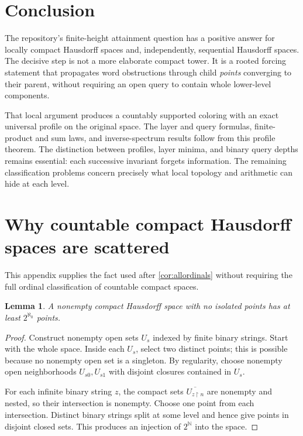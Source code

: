 \documentclass[11pt,letterpaper]{article}
\numberwithin{equation}{section}
\newtheorem{lemma}[lemma]{Lemma}
\theoremstyle{definition}
\theoremstyle{remark}
\theoremstyle{definition}
\newcommand{\N}{\mathbb N}
\begin{document}
\section{Conclusion}\label{uw:sec:conclusion}
The repository's finite-height attainment question has a positive answer for
locally compact Hausdorff spaces and, independently, sequential Hausdorff
spaces. The decisive step is not a more elaborate compact tower. It is a
rooted forcing statement that propagates word obstructions through child
\emph{points} converging to their parent, without requiring an open query to
contain whole lower-level components.

That local argument produces a countably supported coloring with an exact
universal profile on the original space. The layer and query formulas,
finite-product and sum laws, and inverse-spectrum results follow from this
profile theorem. The distinction between profiles, layer minima, and binary
query depths remains essential: each successive invariant forgets information.
The remaining classification problems concern precisely what local topology
and arithmetic can hide at each level.

\appendix
\section{Why countable compact Hausdorff spaces are scattered}\label{app:compact}

This appendix supplies the fact used after \cref{cor:allordinals} without
requiring the full ordinal classification of countable compact spaces.

\begin{lemma}
A nonempty compact Hausdorff space with no isolated points has at least
$2^{\aleph_0}$ points.
\end{lemma}
\begin{proof}
Construct nonempty open sets $U_s$ indexed by finite binary strings. Start with
the whole space. Inside each $U_s$, select two distinct points; this is possible
because no nonempty open set is a singleton. By regularity, choose nonempty
open neighborhoods $U_{s0},U_{s1}$ with disjoint closures contained in $U_s$.

For each infinite binary string $z$, the compact sets
$\overline{U_{z\upharpoonright n}}$ are nonempty and nested, so their intersection
is nonempty. Choose one point from each intersection. Distinct binary strings
split at some level and hence give points in disjoint closed sets. This produces
an injection of $2^\N$ into the space.
\end{proof}
\end{document}
